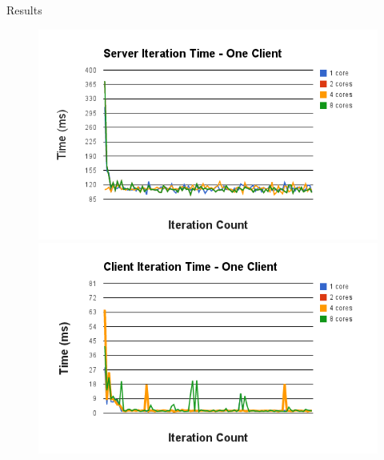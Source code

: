 \documentclass[final]{beamer}
\newlength{\twocolwid}
\begin{document}
\begin{frame}[t]
\begin{columns}[t]
\begin{column}{\twocolwid}
\begin{columns}[t,totalwidth=\twocolwid]
\begin{column}{\twocolwid}
\begin{block}{Results}
\begin{figure}[!htb]
  \includegraphics[width=\linewidth]{server-1.png}
\endminipage\hfill
{}
  \includegraphics[width=\linewidth]{client-1.png}
\endminipage\hfill
\end{figure}


\end{block}
\end{column}
\end{columns}
\end{column}
\end{columns}
\end{frame}
\end{document}
